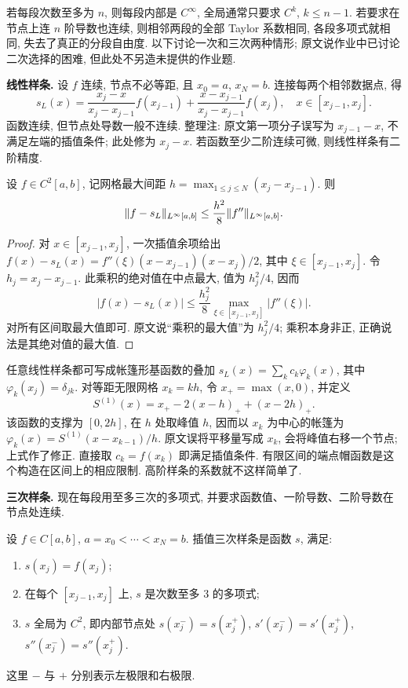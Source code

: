 若每段次数至多为 $n$, 则每段内部是 $C^\infty$, 全局通常只要求 $C^k$, $k\leq n-1$. 若要求在节点上连 $n$ 阶导数也连续, 则相邻两段的全部 Taylor 系数相同, 各段多项式就相同, 失去了真正的分段自由度. 以下讨论一次和三次两种情形; 原文说作业中已讨论二次选择的困难, 但此处不另造未提供的作业题.

\textbf{线性样条.} 设 $f$ 连续, 节点不必等距, 且 $x_0=a$, $x_N=b$. 连接每两个相邻数据点, 得
\begin{equation}\label{eq:linear-spline}
s_L(x)=\frac{x_j-x}{x_j-x_{j-1}}f(x_{j-1})
+\frac{x-x_{j-1}}{x_j-x_{j-1}}f(x_j),\quad x\in[x_{j-1},x_j].
\end{equation}
函数连续, 但节点处导数一般不连续. 整理注: 原文第一项分子误写为 $x_{j-1}-x$, 不满足左端的插值条件; 此处修为 $x_j-x$. 若函数至少二阶连续可微, 则线性样条有二阶精度.

\begin{theorem}\label{thm:linear-spline-error}
设 $f\in C^2[a,b]$, 记网格最大间距 $h=\max_{1\leq j\leq N}(x_j-x_{j-1})$. 则
\[
\lVert f-s_L\rVert_{L^\infty[a,b]}\leq\frac{h^2}{8}\lVert f''\rVert_{L^\infty[a,b]}.
\]
\end{theorem}
\begin{proof}
对 $x\in[x_{j-1},x_j]$, 一次插值余项给出
$f(x)-s_L(x)=f''(\xi)(x-x_{j-1})(x-x_j)/2$, 其中 $\xi\in[x_{j-1},x_j]$. 令 $h_j=x_j-x_{j-1}$. 此乘积的绝对值在中点最大, 值为 $h_j^2/4$, 因而
\[
|f(x)-s_L(x)|\leq\frac{h_j^2}{8}\max_{\xi\in[x_{j-1},x_j]}|f''(\xi)|.
\]
对所有区间取最大值即可. 原文说“乘积的最大值”为 $h_j^2/4$; 乘积本身非正, 正确说法是其绝对值的最大值.
\end{proof}

任意线性样条都可写成帐篷形基函数的叠加 $s_L(x)=\sum_kc_k\varphi_k(x)$, 其中 $\varphi_k(x_j)=\delta_{jk}$. 对等距无限网格 $x_k=kh$, 令 $x_+=\max(x,0)$, 并定义
\[
S^{(1)}(x)=x_+-2(x-h)_++(x-2h)_+.
\]
该函数的支撑为 $[0,2h]$, 在 $h$ 处取峰值 $h$, 因而以 $x_k$ 为中心的帐篷为 $\varphi_k(x)=S^{(1)}(x-x_{k-1})/h$. 原文误将平移量写成 $x_k$, 会将峰值右移一个节点; 上式作了修正. 直接取 $c_k=f(x_k)$ 即满足插值条件. 有限区间的端点帽函数是这个构造在区间上的相应限制. 高阶样条的系数就不这样简单了.

\textbf{三次样条.} 现在每段用至多三次的多项式, 并要求函数值、一阶导数、二阶导数在节点处连续.

\begin{definition}[插值三次样条]\label{def:cubic-spline}
设 $f\in C[a,b]$, $a=x_0<\cdots<x_N=b$. 插值三次样条是函数 $s$, 满足:
\begin{enumerate}
\item $s(x_j)=f(x_j)$;
\item 在每个 $[x_{j-1},x_j]$ 上, $s$ 是次数至多 $3$ 的多项式;
\item $s$ 全局为 $C^2$, 即内部节点处 $s(x_j^-)=s(x_j^+)$, $s'(x_j^-)=s'(x_j^+)$, $s''(x_j^-)=s''(x_j^+)$.
\end{enumerate}
这里 $-$ 与 $+$ 分别表示左极限和右极限.
\end{definition}

